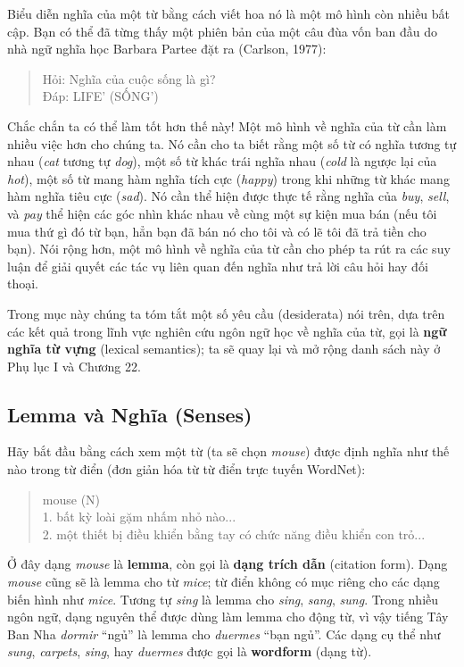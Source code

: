 Biểu diễn nghĩa của một từ bằng cách viết hoa nó là một mô hình còn nhiều bất cập. Bạn có thể đã từng thấy một phiên bản của một câu đùa vốn ban đầu do nhà ngữ nghĩa học Barbara Partee đặt ra (Carlson, 1977):

\begin{quote}
Hỏi: Nghĩa của cuộc sống là gì? \\
Đáp: LIFE' (SỐNG')
\end{quote}

Chắc chắn ta có thể làm tốt hơn thế này! Một mô hình về nghĩa của từ cần làm nhiều việc hơn cho chúng ta. Nó cần cho ta biết rằng một số từ có nghĩa tương tự nhau (\emph{cat} tương tự \emph{dog}), một số từ khác trái nghĩa nhau (\emph{cold} là ngược lại của \emph{hot}), một số từ mang hàm nghĩa tích cực (\emph{happy}) trong khi những từ khác mang hàm nghĩa tiêu cực (\emph{sad}). Nó cần thể hiện được thực tế rằng nghĩa của \emph{buy}, \emph{sell}, và \emph{pay} thể hiện các góc nhìn khác nhau về cùng một sự kiện mua bán (nếu tôi mua thứ gì đó từ bạn, hẳn bạn đã bán nó cho tôi và có lẽ tôi đã trả tiền cho bạn). Nói rộng hơn, một mô hình về nghĩa của từ cần cho phép ta rút ra các suy luận để giải quyết các tác vụ liên quan đến nghĩa như trả lời câu hỏi hay đối thoại.

Trong mục này chúng ta tóm tắt một số yêu cầu (desiderata) nói trên, dựa trên các kết quả trong lĩnh vực nghiên cứu ngôn ngữ học về nghĩa của từ, gọi là \textbf{ngữ nghĩa từ vựng} (lexical semantics); ta sẽ quay lại và mở rộng danh sách này ở Phụ lục I và Chương 22.

\subsection*{Lemma và Nghĩa (Senses)}

Hãy bắt đầu bằng cách xem một từ (ta sẽ chọn \emph{mouse}) được định nghĩa như thế nào trong từ điển (đơn giản hóa từ từ điển trực tuyến WordNet):

\begin{quote}
mouse (N) \\
1. bất kỳ loài gặm nhấm nhỏ nào... \\
2. một thiết bị điều khiển bằng tay có chức năng điều khiển con trỏ...
\end{quote}

Ở đây dạng \emph{mouse} là \textbf{lemma}, còn gọi là \textbf{dạng trích dẫn} (citation form). Dạng \emph{mouse} cũng sẽ là lemma cho từ \emph{mice}; từ điển không có mục riêng cho các dạng biến hình như \emph{mice}. Tương tự \emph{sing} là lemma cho \emph{sing}, \emph{sang}, \emph{sung}. Trong nhiều ngôn ngữ, dạng nguyên thể được dùng làm lemma cho động từ, vì vậy tiếng Tây Ban Nha \emph{dormir} ``ngủ'' là lemma cho \emph{duermes} ``bạn ngủ''. Các dạng cụ thể như \emph{sung}, \emph{carpets}, \emph{sing}, hay \emph{duermes} được gọi là \textbf{wordform} (dạng từ).

